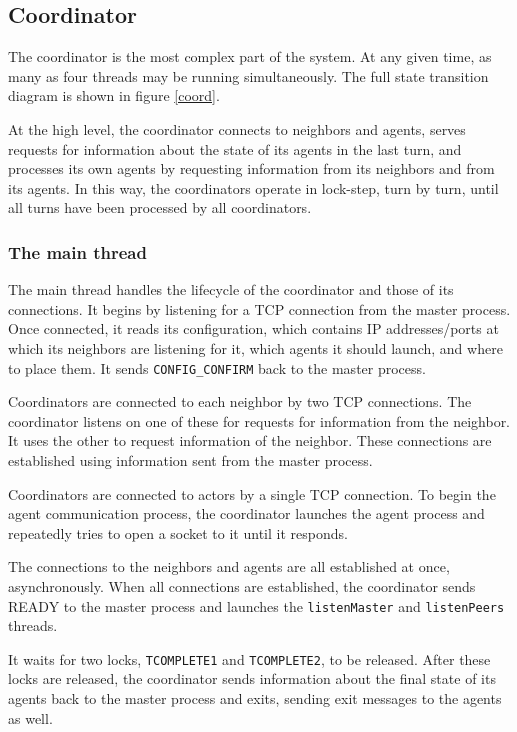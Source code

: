 \subsection{Coordinator}

The coordinator is the most complex part of the system. At any given time, as many as four threads may be running simultaneously. The full state transition diagram is shown in figure \ref{coord}.

At the high level, the coordinator connects to neighbors and agents, serves requests for information about the state of its agents in the last turn, and processes its own agents by requesting information from its neighbors and from its agents. In this way, the coordinators operate in lock-step, turn by turn, until all turns have been processed by all coordinators.

\subsubsection{The main thread}

The main thread handles the lifecycle of the coordinator and those of its connections. It begins by listening for a TCP connection from the master process. Once connected, it reads its configuration, which contains IP addresses/ports at which its neighbors are listening for it, which agents it should launch, and where to place them. It sends \texttt{CONFIG\_CONFIRM} back to the master process.

Coordinators are connected to each neighbor by two TCP connections. The coordinator listens on one of these for requests for information from the neighbor. It uses the other to request information of the neighbor. These connections are established using information sent from the master process.

Coordinators are connected to actors by a single TCP connection. To begin the agent communication process, the coordinator launches the agent process and repeatedly tries to open a socket to it until it responds.

The connections to the neighbors and agents are all established at once, asynchronously. When all connections are established, the coordinator sends READY to the master process and launches the \texttt{listenMaster} and \texttt{listenPeers} threads.

It waits for two locks, \texttt{TCOMPLETE1} and \texttt{TCOMPLETE2}, to be released. After these locks are released, the coordinator sends information about the final state of its agents back to the master process and exits, sending exit messages to the agents as well.

